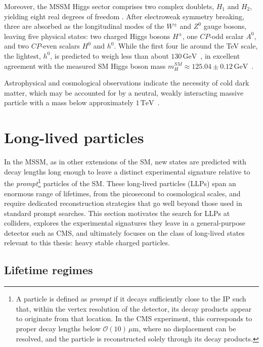 Moreover, the MSSM Higgs sector comprises two complex doublets, $H_1$ and $H_2$, yielding eight real degrees of freedom \cite{Ellis:591472}. After electroweak symmetry breaking, three are absorbed as the longitudinal modes of the $W^\pm$ and $Z^0$ gauge bosons, leaving five physical states: two charged Higgs bosons $H^\pm$, one $CP$-odd scalar $A^0$, and two $CP$-even scalars $H^0$ and $h^0$. While the first four lie around the TeV scale, the lightest, $h^0$, is predicted to weigh less than about $130\,\mathrm{GeV}$~\cite{Carena_2003}, in excellent agreement with the measured SM Higgs boson mass $m_H^{SM} \approx 125.04 \pm 0.12\,\mathrm{GeV}$~\cite{Vagnerini:2905108}.

Astrophysical and cosmological observations indicate the necessity of cold dark matter, which may be accounted for by a neutral, weakly interacting massive particle with a mass below approximately $1\,\mathrm{TeV}$~\cite{ELLIS1984453}.



\section{Long-lived particles}
\label{sec:llp}

In the MSSM, as in other extensions of the SM, new states are predicted with decay lengths long enough to leave a distinct experimental signature relative to the \textit{prompt}\footnote{A particle is defined as \textit{prompt} if it decays sufficiently close to the IP such that, within the vertex resolution of the detector, its decay products appear to originate from that location. In the CMS experiment, this corresponds to proper decay lengths below $\mathcal{O}(10)\,\mu$m, where no displacement can be resolved, and the particle is reconstructed solely through its decay products.} particles of the SM. These long-lived particles (LLPs) span an enormous range of lifetimes, from the picosecond to cosmological scales, and require dedicated reconstruction strategies that go well beyond those used in standard prompt searches. This section motivates the search for LLPs at colliders, explores the experimental signatures they leave in a general-purpose detector such as CMS, and ultimately focuses on the class of long-lived states relevant to this thesis: heavy stable charged particles.


\subsection{Lifetime regimes}

